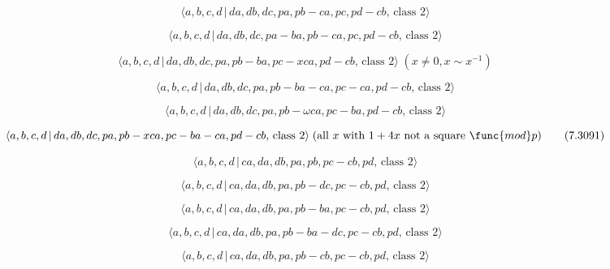 \documentclass[10pt]{article}
\begin{document}
\begin{equation}
\langle a,b,c,d\,|\,da,db,dc,pa,pb-ca,pc,pd-cb,\,\text{class }2\rangle 
\tag{7.3086}
\end{equation}

\begin{equation}
\langle a,b,c,d\,|\,da,db,dc,pa-ba,pb-ca,pc,pd-cb,\,\text{class }2\rangle 
\tag{7.3087}
\end{equation}

\begin{equation}
\langle a,b,c,d\,|\,da,db,dc,pa,pb-ba,pc-xca,pd-cb,\,\text{class }2\rangle
\;(x \neq 0, x \sim x^{-1})  \tag{7.3088}
\end{equation}

\begin{equation}
\langle a,b,c,d\,|\,da,db,dc,pa,pb-ba-ca,pc-ca,pd-cb,\,\text{class }2\rangle
\tag{7.3089}
\end{equation}

\begin{equation}
\langle a,b,c,d\,|\,da,db,dc,pa,pb-\omega ca,pc-ba,pd-cb,\,\text{class }%
2\rangle  \tag{7.3090}
\end{equation}

\begin{equation}
\langle a,b,c,d\,|\,da,db,dc,pa,pb-xca,pc-ba-ca,pd-cb,\,\text{class }%
2\rangle \;(\text{all }x\text{ with }1+4x\text{ not a square }\func{mod}p) 
\tag{7.3091}
\end{equation}

\begin{equation}
\langle a,b,c,d\,|\,ca,da,db,pa,pb,pc-cb,pd,\,\text{class }2\rangle 
\tag{7.3092}
\end{equation}

\begin{equation}
\langle a,b,c,d\,|\,ca,da,db,pa,pb-dc,pc-cb,pd,\,\text{class }2\rangle 
\tag{7.3093}
\end{equation}

\begin{equation}
\langle a,b,c,d\,|\,ca,da,db,pa,pb-ba,pc-cb,pd,\,\text{class }2\rangle 
\tag{7.3094}
\end{equation}

\begin{equation}
\langle a,b,c,d\,|\,ca,da,db,pa,pb-ba-dc,pc-cb,pd,\,\text{class }2\rangle 
\tag{7.3095}
\end{equation}

\begin{equation}
\langle a,b,c,d\,|\,ca,da,db,pa,pb-cb,pc-cb,pd,\,\text{class }2\rangle 
\tag{7.3096}
\end{equation}
\end{document}
